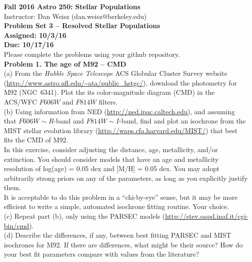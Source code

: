 \documentclass{article}
\begin{document}
\noindent \textbf{\large{Fall 2016 Astro 250: Stellar Populations}} \\
\noindent Instructor: Dan Weisz (dan.weisz@berkeley.edu) \\
\textbf{\large{Problem Set 3 -- Resolved Stellar Populations}} \\
\textbf{{Assigned: 10/3/16}} \\
\textbf{{Due: 10/17/16}} \\

Please complete the problems using your github repository. \\


\noindent \textbf{Problem 1. The age of M92 -- CMD} \\ 

(a) From the \textit{Hubble Space Telescope} ACS Globular Cluster Survey website (\url{http://www.astro.ufl.edu/~ata/public_hstgc/}), download the photometry for M92 (NGC~6341).  Plot the its color-magnitude diagram (CMD) in the ACS/WFC $F606W$ and $F814W$ filters. \\

(b) Using information from NED (\url{http://ned.ipac.caltech.edu}), and assuming that $F606W \sim R$-band and $F814W \sim I$-band, find and plot an isochrone from the MIST stellar evolution library (\url{http://waps.cfa.harvard.edu/MIST/}) that best fits the CMD of M92.   \\

In this exercise, consider adjusting the distance, age, metallicity, and/or extinction.  You should consider models that have an age and metallicity resolution of log(age) = 0.05 dex and [M/H] = 0.05 dex. You may adopt arbitrarily strong priors on any of the parameters, as long as you explicitly justify them. \\

It is acceptable to do this problem in a ``chi-by-eye'' sense, but it may be more efficient to write a simple, automated isochrone fitting routine. Your choice. \\

(c) Repeat part (b), only using the PARSEC models (\url{http://stev.oapd.inaf.it/cgi-bin/cmd}). \\

(d) Describe the differences, if any, between best fitting PARSEC and MIST isochrones for M92.  If there are differences, what might be their source?  How do your best fit parameters compare with values from the literature? \\
\end{document}
